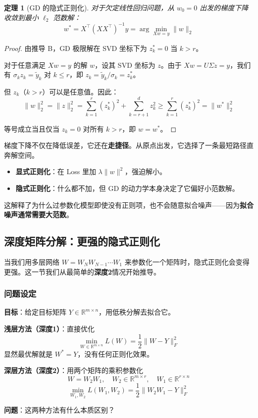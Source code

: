 \documentclass[12pt, a4paper]{ctexart}
\newtheorem{theorem}{定理}[section]
\begin{document}
\begin{theorem}[GD 的隐式正则化]
对于欠定线性回归问题，从 $w_0 = 0$ 出发的梯度下降收敛到最小 $\ell_2$ 范数解：
\[
w^* = X^\top (XX^\top)^{-1} y = \arg\min_{Xw=y} \|w\|_2
\]
\end{theorem}

\begin{proof}
由推导 B，GD 极限解在 SVD 坐标下为 $z_k^* = 0$ 当 $k > r$。

对于任意满足 $Xw = y$ 的解 $w$，设其 SVD 坐标为 $z$。由于 $Xw = U\Sigma z = y$，我们有 $\sigma_k z_k = \tilde{y}_k$ 对 $k \leq r$，即 $z_k = \tilde{y}_k/\sigma_k = z_k^*$。

但 $z_k$（$k > r$）可以是任意值。因此：
\[
\|w\|_2^2 = \|z\|_2^2 = \sum_{k=1}^{r} (z_k^*)^2 + \sum_{k=r+1}^{d} z_k^2 \geq \sum_{k=1}^{r} (z_k^*)^2 = \|w^*\|_2^2
\]

等号成立当且仅当 $z_k = 0$ 对所有 $k > r$，即 $w = w^*$。
\end{proof}

\begin{insight}[GD 是"懒惰"的]
梯度下降不仅在降低误差，它还在\textbf{走捷径}。从原点出发，它选择了一条最短路径直奔解空间。

\begin{itemize}
    \item \textbf{显式正则化}：在 Loss 里加 $\lambda\|w\|^2$，强迫解小。
    \item \textbf{隐式正则化}：什么都不加，但 GD 的动力学本身决定了它偏好小范数解。
\end{itemize}

这解释了为什么过参数化模型即使没有正则项，也不会随意拟合噪声——因为\textbf{拟合噪声通常需要大范数}。
\end{insight}

\subsection{深度矩阵分解：更强的隐式正则化}

当我们用多层网络 $W = W_N W_{N-1} \cdots W_1$ 来参数化一个矩阵时，隐式正则化会变得更强。这一节我们从最简单的\textbf{深度2}情况开始推导。

\subsubsection{问题设定}

\begin{blackboard}[矩阵分解问题]

\textbf{目标}：给定目标矩阵 $Y \in \mathbb{R}^{m \times n}$，用低秩分解去拟合它。

\textbf{浅层方法（深度1）}：直接优化
\[
\min_{W \in \mathbb{R}^{m \times n}} L(W) = \frac{1}{2}\|W - Y\|_F^2
\]
显然最优解就是 $W^* = Y$，没有任何正则化效果。

\textbf{深层方法（深度2）}：用两个矩阵的乘积参数化
\[
W = W_2 W_1, \quad W_2 \in \mathbb{R}^{m \times r}, \quad W_1 \in \mathbb{R}^{r \times n}
\]
\[
\min_{W_1, W_2} L(W_1, W_2) = \frac{1}{2}\|W_2 W_1 - Y\|_F^2
\]

\textbf{问题}：这两种方法有什么本质区别？

\end{blackboard}
\end{document}
